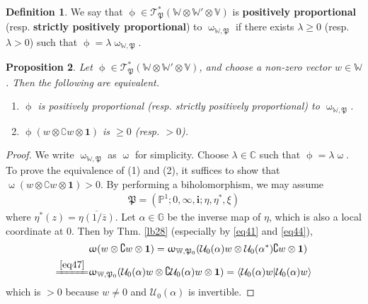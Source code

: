 \documentclass[11pt,b5paper,notitlepage]{article}
\theoremstyle{definition}
\newtheorem{df}{Definition}[section]
\theoremstyle{plain}
\newtheorem{pp}[df]{Proposition}
\newcommand{\fk}{\mathfrak}
\newcommand{\mc}{\mathcal}
\newcommand{\ovl}{\overline}
\newcommand{\id}{\mathbf{1}}
\newcommand{\bk}[1]{\langle {#1}\rangle}
\newcommand{\scr}{\mathscr}
\newcommand{\im}{\mathbf{i}}
\newcommand{\Co}{\complement}
\newcommand{\Vbb}{\mathbb V}
\newcommand{\Wbb}{\mathbb W}
\newcommand{\Gbb}{\mathbb G}
\newcommand{\Cbb}{\mathbb C}
\newcommand{\Pbb}{\mathbb P}
\numberwithin{equation}{section}
\begin{document}
\begin{df}
We say that $\upphi\in\scr T_{\fk P}^*(\Wbb\otimes\Wbb'\otimes\Vbb)$ is \textbf{positively proportional} (resp. \textbf{strictly positively proportional}) to $\upomega_{\Wbb,\fk P}$ if there exists $\lambda\geq0$ (resp. $\lambda>0$) such that $\upphi=\lambda\upomega_{\Wbb,\fk P}$.
\end{df}


\begin{pp}\label{lb32}
Let $\upphi\in\scr T_{\fk P}^*(\Wbb\otimes\Wbb'\otimes\Vbb)$, and choose a non-zero vector $w\in\Wbb$. Then the following are equivalent.
\begin{enumerate}[label=(\arabic*)]
\item $\upphi$ is positively proportional (resp. strictly positively proportional) to $\upomega_{\Wbb,\fk P}$.
\item $\upphi(w\otimes \Co w\otimes \id)$ is $\geq 0$ (resp. $>0$).
\end{enumerate}
\end{pp}


\begin{proof}
We write $\upomega_{\Wbb,\fk P}$ as $\upomega$ for simplicity. Choose $\lambda\in\Cbb$ such that $\upphi=\lambda\upomega$. To prove the equivalence of (1) and (2), it suffices to show that $\upomega(w\otimes\Co w\otimes\id)>0$. By performing a biholomorphism, we may assume
\begin{align*}
\fk P=(\Pbb^1;0,\infty,\im;\eta,\eta^*,\xi)
\end{align*}
where $\eta^*(z)=\ovl{\eta(1/\ovl z)}$. Let $\alpha\in\Gbb$ be the inverse map of $\eta$, which is also a local coordinate at $0$. Then by Thm. \ref{lb28} (especially by \eqref{eq41} and \eqref{eq44}),
\begin{align*}
&\upomega(w\otimes\Co w\otimes\id)=\upomega_{\Wbb,\fk P_0}(\mc U_0(\alpha)w\otimes \mc U_0(\alpha^*)\Co w\otimes \id)\\
\xlongequal{\eqref{eq47}}&\upomega_{\Wbb,\fk P_0}(\mc U_0(\alpha)w\otimes \Co\mc U_0(\alpha) w\otimes \id)=\bk{\mc U_0(\alpha) w|\mc U_0(\alpha) w}
\end{align*}
which is $>0$ because $w\neq 0$ and $\mc U_0(\alpha)$ is invertible.
\end{proof}
\end{document}
